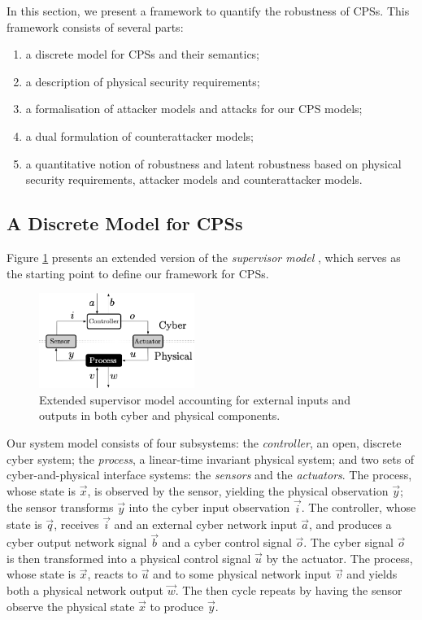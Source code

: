 In this section, we present a framework to quantify the robustness of CPSs. This framework consists of several parts:
\begin{enumerate}
  \item a discrete model for CPSs and their semantics; 
  \item a description of physical security requirements;
  \item a formalisation of attacker models and attacks for our CPS models;
  \item a dual formulation of counterattacker models;
  \item a quantitative notion of robustness and latent robustness based on physical security requirements, attacker models and counterattacker models.
\end{enumerate}

\subsection{A Discrete Model for CPSs}
Figure \ref{fig:IFCPS} presents an extended version of the \emph{supervisor model} \cite{doi:10.1137/0325013}, which serves as the starting point to define our framework for CPSs. 
\begin{figure}
\centering
\includegraphics[width=0.45\textwidth]{Figures/IFCPS}
\caption{Extended supervisor model accounting for external inputs and outputs in both cyber and physical components.}
\label{fig:IFCPS}
\end{figure}
Our system model consists of four subsystems: the \emph{controller}, an open, discrete cyber system; the \emph{process}, a linear-time invariant physical system; and two sets of cyber-and-physical interface systems: the \emph{sensors} and the \emph{actuators}. The process, whose state is $\vec{x}$, is observed by the sensor, yielding the physical observation $\vec{y}$; the sensor transforms $\vec{y}$ into the cyber input observation $\vec{i}$. The controller, whose state is $\vec{q}$, receives $\vec{i}$ and an external cyber network input $\vec{a}$, and produces a cyber output network signal $\vec{b}$ and a cyber control signal $\vec{o}$. The cyber signal $\vec{o}$ is then transformed into a physical control signal $\vec{u}$ by the actuator. The process, whose state is $\vec{x}$, reacts to $\vec{u}$ and to some physical network input $\vec{v}$ and yields both a physical network output $\vec{w}$. The then cycle repeats by having the sensor observe the physical state $\vec{x}$ to produce $\vec{y}$. 

